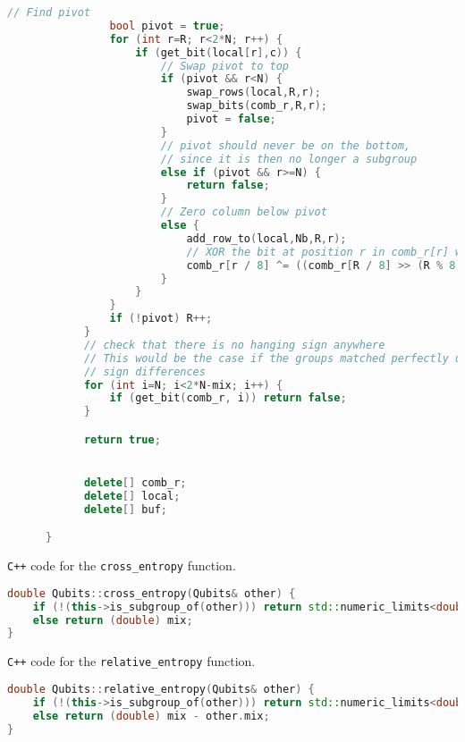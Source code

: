 \begin{lstlisting}[caption=\texttt{is\_subgroup\_of} function in the simulator,
label={lst:is-subgroup-of-cpp}, language=C++]
                // Find pivot
                bool pivot = true;
                for (int r=R; r<2*N; r++) {
                    if (get_bit(local[r],c)) {
                        // Swap pivot to top
                        if (pivot && r<N) {
                            swap_rows(local,R,r);
                            swap_bits(comb_r,R,r);
                            pivot = false;
                        }
                        // pivot should never be on the bottom,
                        // since it is then no longer a subgroup
                        else if (pivot && r>=N) {
                            return false;
                        }
                        // Zero column below pivot
                        else {
                            add_row_to(local,Nb,R,r);
                            // XOR the bit at position r in comb_r[r] with the bit at position R in comb_r[R]
                            comb_r[r / 8] ^= ((comb_r[R / 8] >> (R % 8)) & 1) << (r % 8);
                        }
                    }
                }
                if (!pivot) R++;
            }
            // check that there is no hanging sign anywhere
            // This would be the case if the groups matched perfectly up to
            // sign differences
            for (int i=N; i<2*N-mix; i++) {
                if (get_bit(comb_r, i)) return false;
            }

            return true;


            delete[] comb_r;
            delete[] local;
            delete[] buf;

      }
\end{lstlisting}

\verb|C++| code for the \verb|cross_entropy| function.
\begin{lstlisting}[caption=\texttt{cross\_entropy} function in the simulator,
label={lst:cross-entropy-cpp}, language=C++]
double Qubits::cross_entropy(Qubits& other) {
    if (!(this->is_subgroup_of(other))) return std::numeric_limits<double>::quiet_NaN();
    else return (double) mix;
}
\end{lstlisting}

\verb|C++| code for the \verb|relative_entropy| function.
\begin{lstlisting}[caption=\texttt{relative\_entropy} function in the simulator,
label={lst:relative-entropy-cpp}, language=C++]
double Qubits::relative_entropy(Qubits& other) {
    if (!(this->is_subgroup_of(other))) return std::numeric_limits<double>::quiet_NaN();
    else return (double) mix - other.mix;
}
\end{lstlisting}

